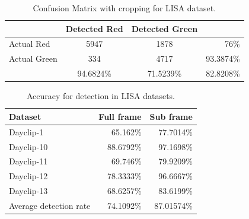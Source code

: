\begin{table}[h!]
  \centering
  \caption{Confusion Matrix with cropping for LISA dataset.}
  \label{t:con_crp}
  \begin{tabular}{  l | c | c | r }
   
     & Detected Red & Detected Green &  \\
    \hline
    Actual Red & 5947 & 1878 & 76\% \\
    \hline
    Actual Green & 334 & 4717 & 93.3874\% \\
    \hline
    & 94.6824\% & 71.5239\% & 82.8208\% \\
    
  \end{tabular}
\end{table}

\begin{table}[h!]
  \centering
  \caption{Accuracy for detection in LISA datasets.}
  \label{t:acc_stat}
  \begin{tabular}{  l  r  r }
    \rowcolor{gray!50}
    Dataset & Full frame & Sub frame \\
    \hline
    Dayclip-1 & 65.162\% & 77.7014\% \\
    Dayclip-10 & 88.6792\% & 97.1698\% \\
    Dayclip-11 & 69.746\% & 79.9209\% \\
    Dayclip-12 & 78.3333\% & 96.6667\% \\
    Dayclip-13 & 68.6257\% & 83.6199\%\\
    \hline
    Average detection rate & 74.1092\% & 87.01574\% \\
  \end{tabular}
\end{table}




